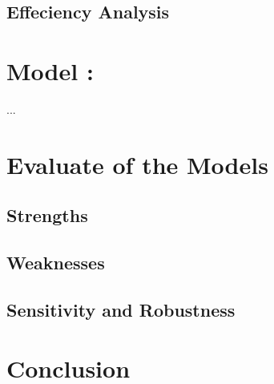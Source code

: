 \subsection{Effeciency Analysis}

\section{Model \uppercase\expandafter{}: }
... 

\section{Evaluate of the Models}
\subsection{Strengths}

\subsection{Weaknesses}

\subsection{Sensitivity and Robustness}
\section{Conclusion}




